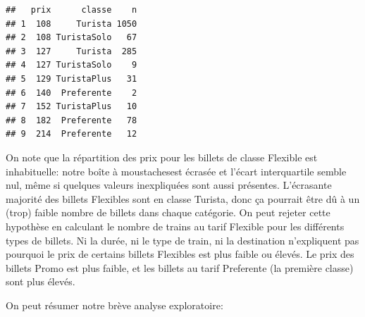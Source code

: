 \documentclass[
  11pt,
  letterpaper,
]{book}
\theoremstyle{definition}
\theoremstyle{definition}
\theoremstyle{definition}
\theoremstyle{remark}
\begin{document}
\begin{verbatim}
##   prix      classe    n
## 1  108     Turista 1050
## 2  108 TuristaSolo   67
## 3  127     Turista  285
## 4  127 TuristaSolo    9
## 5  129 TuristaPlus   31
## 6  140  Preferente    2
## 7  152 TuristaPlus   10
## 8  182  Preferente   78
## 9  214  Preferente   12
\end{verbatim}

On note que la répartition des prix pour les billets de classe Flexible est inhabituelle: notre boîte à moustachesest écrasée et l'écart interquartile semble nul, même si quelques valeurs inexpliquées sont aussi présentes. L'écrasante majorité des billets Flexibles sont en classe Turista, donc ça pourrait être dû à un (trop) faible nombre de billets dans chaque catégorie. On peut rejeter cette hypothèse en calculant le nombre de trains au tarif Flexible pour les différents types de billets. Ni la durée, ni le type de train, ni la destination n'expliquent pas pourquoi le prix de certains billets Flexibles est plus faible ou élevés. Le prix des billets Promo est plus faible, et les billets au tarif Preferente (la première classe) sont plus élevés.

On peut résumer notre brève analyse exploratoire:
\end{document}
